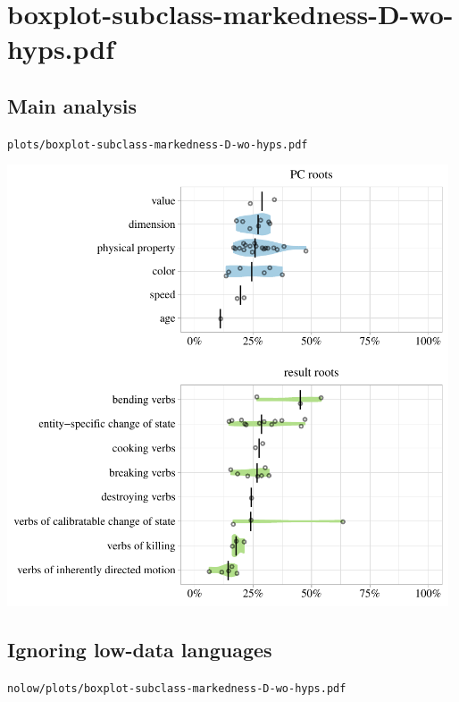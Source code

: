 \eject

\section{boxplot-subclass-markedness-D-wo-hyps.pdf}

\subsection{Main analysis}

\texttt{plots/boxplot-subclass-markedness-D-wo-hyps.pdf}

\includegraphics[width=0.98\textwidth]{../plots/boxplot-subclass-markedness-D-wo-hyps.pdf}

\subsection{Ignoring low-data languages}

\texttt{nolow/plots/boxplot-subclass-markedness-D-wo-hyps.pdf}

